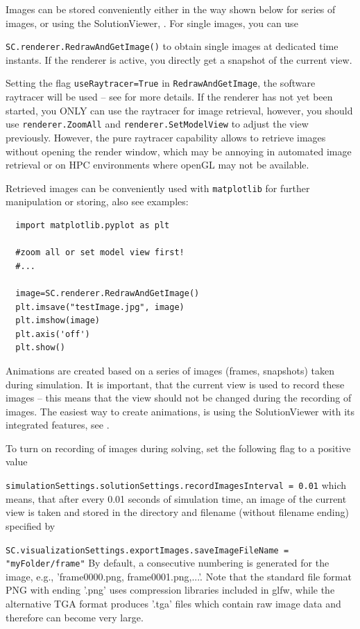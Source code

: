Images can be stored conveniently either in the way shown below for series of images, or using the SolutionViewer, .
For single images, you can use 
\bi
  \item \texttt{SC.renderer.RedrawAndGetImage()}
\ei
to obtain single images at dedicated time instants.
If the renderer is active, you directly get a snapshot of the current view. 

Setting the flag \texttt{useRaytracer=True} in \texttt{RedrawAndGetImage}, the software raytracer will be used -- see  for more details.
If the renderer has not yet been started, you ONLY can use the raytracer for image retrieval, however, you should use \texttt{renderer.ZoomAll} and \texttt{renderer.SetModelView} to adjust the view previously.
However, the pure raytracer capability allows to retrieve images without opening the render window, which may be annoying in automated image retrieval or on HPC environments where openGL may not be available.

Retrieved images can be conveniently used with \texttt{matplotlib} for further manipulation or storing, also see examples:
%
\pythonstyle\begin{lstlisting}
  import matplotlib.pyplot as plt

  #zoom all or set model view first!
  #...

  image=SC.renderer.RedrawAndGetImage()
  plt.imsave("testImage.jpg", image)
  plt.imshow(image)
  plt.axis('off')
  plt.show()
\end{lstlisting}


Animations are created based on a series of images (frames, snapshots) taken during simulation. It is important, that the current view is used to record these images -- this means that the view should not be changed during the recording of images.
The easiest way to create animations, is using the SolutionViewer with its integrated features, see .

To turn on recording of images during solving, set the following flag to a positive value
\bi
  \item \texttt{simulationSettings.solutionSettings.recordImagesInterval = 0.01}
\ei
which means, that after every 0.01 seconds of simulation time, an image of the current view is taken and stored in the directory and filename (without filename ending) specified by 
\bi
  \item \texttt{SC.visualizationSettings.exportImages.saveImageFileName = "myFolder/frame"}
\ei
By default, a consecutive numbering is generated for the image, e.g., 'frame0000.png, frame0001.png,...'. Note that the standard file format PNG with ending '.png' uses compression libraries included in glfw, while the alternative TGA format produces '.tga' files which contain raw image data and therefore can become very large.

